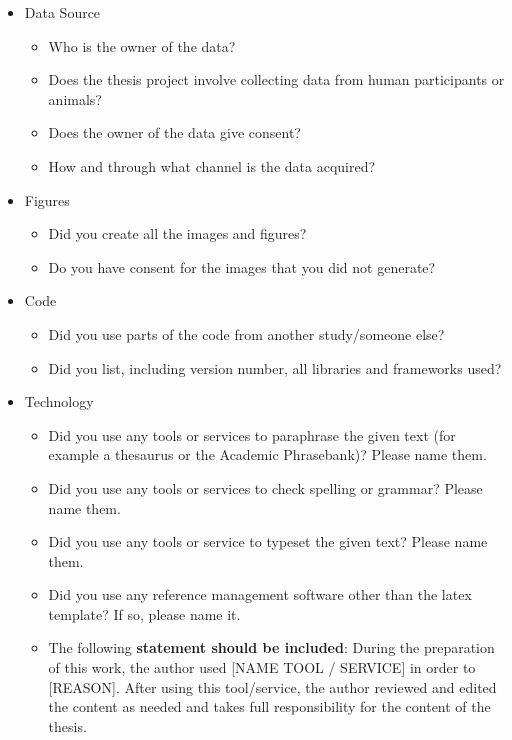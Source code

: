 \documentclass[11pt, a4paper]{article}
\begin{document}
\begin{itemize}
    \item[•] {Data Source}
    \begin{itemize}
        \item[o] {Who is the owner of the data?}
        \item[o] {Does the thesis project involve collecting data from human participants or animals?}
        \item[o] {Does the owner of the data give consent?}
        \item[o] {How and through what channel is the data acquired?}
    \end{itemize}
    \item[•] {Figures}
    \begin{itemize}
        \item[o] {Did you create all the images and figures?}
        \item[o] {Do you have consent for the images that you did not generate?}
    \end{itemize}
    \item[•] {Code}
    \begin{itemize}
        \item[o] {Did you use parts of the code from another study/someone else?}
        \item[o] {Did you list, including version number, all libraries and frameworks used?}
    \end{itemize}
    \item[•] {Technology}
    \begin{itemize}
        \item[o] {Did you use any tools or services to paraphrase the given text (for example a thesaurus or the Academic Phrasebank)? Please name them.}
        \item[o] {Did you use any tools or services to check spelling or grammar? Please name them.}
        \item[o] {Did you use any tools or service to typeset the given text? Please name them.}
        \item[o] {Did you use any reference management software other than the latex template? If so, please name it.}
        \item[o] {The following \textbf{statement should be included}: During the preparation of this work, the author used [NAME TOOL / SERVICE] in order to [REASON]. After using this tool/service, the author reviewed and edited the content as needed and takes full responsibility for the content of the thesis.}
    \end{itemize}
\end{itemize}
\end{document}

